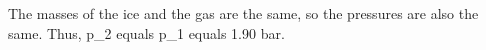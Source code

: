 The masses of the ice and the gas are the same, so the pressures are also the same.  
Thus, p_2 equals p_1 equals 1.90 bar.